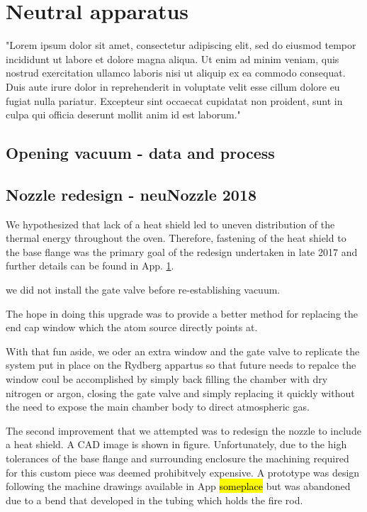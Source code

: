 \chapter{Neutral apparatus } \label{app:breakingVacuum}
"Lorem ipsum dolor sit amet, consectetur adipiscing elit, sed do eiusmod tempor incididunt ut labore et dolore magna aliqua. Ut enim ad minim veniam, quis nostrud exercitation ullamco laboris nisi ut aliquip ex ea commodo consequat. Duis aute irure dolor in reprehenderit in voluptate velit esse cillum dolore eu fugiat nulla pariatur. Excepteur sint occaecat cupidatat non proident, sunt in culpa qui officia deserunt mollit anim id est laborum."

\section{Opening vacuum - data and process}

\section{Nozzle redesign - neuNozzle 2018}


We hypothesized that lack of a heat shield led to uneven distribution of the thermal energy throughout the oven.
Therefore, fastening of the heat shield to the base flange was the primary goal of the redesign undertaken in late 2017 and further details can be found in App. \ref{app:breakingVacuum}. 

 we did not install the gate valve before re-establishing vacuum. 

The hope in doing this upgrade was to provide a better method for replacing the end cap window which the atom source directly points at. 

With that fun aside, we oder an extra window and the gate valve to replicate the system put in place on the Rydberg appartus so that future needs to repalce the window coul be accomplished by simply back filling the chamber with dry nitrogen or argon, closing the gate valve and simply replacing it quickly without the need to expose the main chamber body to direct atmospheric gas. 

The second improvement that we attempted was to redesign the nozzle to include a heat shield. A CAD image is shown in figure. Unfortunately, due to the high tolerances of the base flange and surrounding enclosure the machining required for this custom piece was deemed prohibitvely expensive. A prototype was design following the machine drawings available in App \hl{someplace} but was abandoned due to a bend that developed in the tubing which holds the fire rod. 

